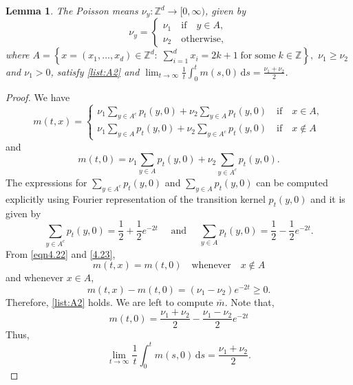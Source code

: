\documentclass[10pt,a4paper]{amsart}
\newtheorem{lemma}{Lemma}
\newcommand{\Z}{\mathbb{Z}}
\newcommand{\dd }{\mathrm{d} }
\begin{document}
 \begin{lemma}
  The Poisson means $\nu_y:\Z^d \to [0,\infty)$, given by
   \begin{equation}
    \nu_y = \left\{\begin{array}{l}
      \nu_1 \quad \text{if} \quad y \in A,\\
      \nu_2  \quad \text{otherwise},
    \end{array}\right.
  \end{equation}
  where $A = \left\{ x = (x_1, \ldots, x_d) \in \mathbb{Z}^d :\;
  \sum_{i = 1}^d x_i = 2 k + 1 \;\text{for}\;
  \text{some}\;k \in \mathbb{Z} \right\},$ $\nu_1 \geq \nu_2$ and $\nu_1>0$, 
 satisfy \ref{list:A2} and $\lim_{t\to\infty}\frac{1}{t}\int_0^t m(s,0)\,\dd s = \frac{\nu_1 + \nu_2}{2}$.
  \label{clm:periodiccase}
  \end{lemma}

\begin{proof}
We have
  \begin{equation}
    m(t,x) = \left\{\begin{array}{l}
      \nu_1 \sum_{{y \in A^c} } p_t(y,0) +
      \nu_2 \sum_{y \in A } p_t(y,0) \quad
      \text{if} \quad x \in A,\\
      \nu_1 \sum_{y \in A } p_t(y,0)+ \nu_2
      \sum_{{y \in A^c} } p_t(y,0)\quad
      \text{if} \quad x \not\in A
    \end{array}\right.
    \label{eqn4.22}
  \end{equation}
  and
  \begin{equation}
    m(t,0) =
    \nu_1 \sum_{y \in A } p_t(y,0)+ \nu_2
    \sum_{{y \in A^c} } p_t(y,0).
    \label{4.23}
  \end{equation}
  The expressions for $\sum_{{y \in A^c} } p_t(y,0)$ and $\sum_{{y \in A } } p_t(y,0)$ can
  be computed explicitly using Fourier representation of the transition kernel $p_t(y,0)$ and it is given by
  \begin{equation}
      \sum_{{y \in A^c} } p_t(y,0) = \frac{1}{2}+ \frac{1}{2}e^{-2t} \quad \text{ and }\quad 
      \sum_{{y \in A} } p_t(y,0) = \frac{1}{2}- \frac{1}{2}e^{-2t}.
      \label{eqn:partition}
  \end{equation}
  From \eqref{eqn4.22} and \eqref{4.23},
  \[ m(t,x) = m(t,0) \quad \text{whenever} \quad x \not\in A \]
  and whenever $x \in A$,
  \[ m(t,x) - m(t,0) = (\nu_1 - \nu_2)e^{-2t} \geq 0. \]
  Therefore, \ref{list:A2} holds. We are left to compute $\bar m$. Note that,
\begin{equation}
    m(t,0) =
    \frac{\nu_1 + \nu_2}{2} - \frac{\nu_1-\nu_2}{2}e^{-2t}
    \label{eqn:mt0}
  \end{equation}
  Thus, 
  $$\lim_{t\to\infty}\frac{1}{t}\int_0^t m(s,0)\, \dd s = \frac{\nu_1+\nu_2}{2}.$$
  \end{proof}
\end{document}
